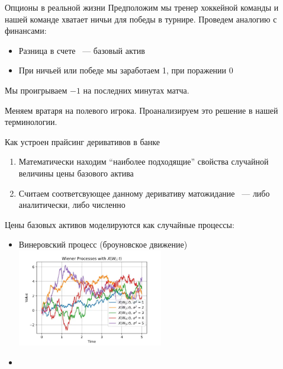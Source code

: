 \documentclass{beamer}
\newcommand{\quotes}[1]{``#1''}
\begin{document}
        \begin{frame}{Опционы в реальной жизни}
            Предположим мы тренер хоккейной команды и нашей команде хватает ничьи для победы в турнире.
            Проведем аналогию с финансами:
            \begin{itemize}
                \item Разница в счете ~--- базовый актив
                \item При ничьей или победе мы заработаем 1, при поражении 0
            \end{itemize}
            Мы проигрываем $-1$ на последних минутах матча.

            Меняем вратаря на полевого игрока.
            Проанализируем это решение в нашей терминологии.
        \end{frame}

        \begin{frame}{Как устроен прайсинг деривативов в банке}
            \begin{enumerate}
                \item Математически находим \quotes{наиболее подходящие} свойства случайной величины цены базового актива
                \item Считаем соответсвующее данному деривативу матожидание ~--- либо аналитически, либо численно
            \end{enumerate}
        \end{frame}

        \begin{frame}
            Цены базовых активов моделируются как случайные процессы:
            \begin{itemize}
                \item Винеровский процесс (броуновское движение)
                \includegraphics[width=0.5\textwidth]{wiener.png}
                \item
            \end{itemize}
        \end{frame}

    
\end{document}
